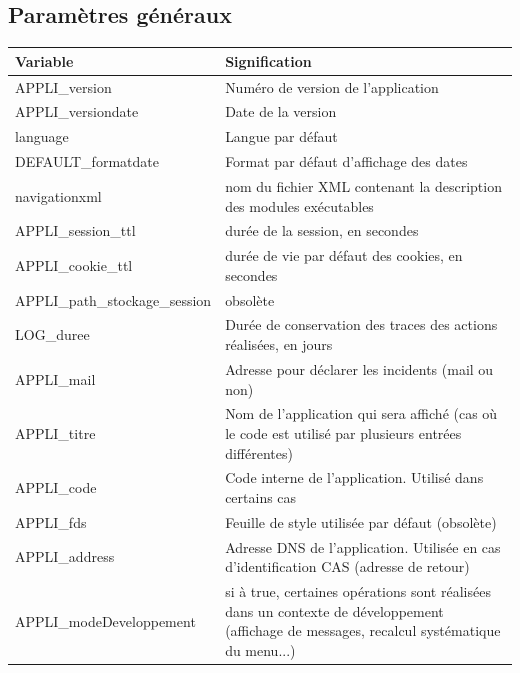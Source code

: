 \subsection{Paramètres généraux}
\begin{longtable}{|p{5cm}|p{8cm}|}
\hline
\textbf{Variable} & \textbf{Signification} \\
\hline
\endhead
APPLI\_version & Numéro de version de l'application \\ 

APPLI\_versiondate & Date de la version \\ 

language & Langue par défaut \\

DEFAULT\_formatdate & Format par défaut d'affichage des dates\\

navigationxml & nom du fichier XML contenant la description des modules exécutables\\

APPLI\_session\_ttl & durée de la session, en secondes\\

APPLI\_cookie\_ttl & durée de vie par défaut des cookies, en secondes\\

APPLI\_path\_stockage\_session & obsolète\\

LOG\_duree & Durée de conservation des traces des actions réalisées, en jours\\

APPLI\_mail & Adresse pour déclarer les incidents (mail ou non)\\

APPLI\_titre & Nom de l'application qui sera affiché (cas où le code est utilisé par plusieurs entrées différentes) \\

APPLI\_code & Code interne de l'application. Utilisé dans certains cas\\

APPLI\_fds & Feuille de style utilisée par défaut (obsolète)\\

APPLI\_address & Adresse DNS de l'application. Utilisée en cas d'identification CAS (adresse de retour)\\

APPLI\_modeDeveloppement & si à true, certaines opérations sont réalisées dans un contexte de développement (affichage de messages, recalcul systématique du menu...)\\


\end{longtable}
